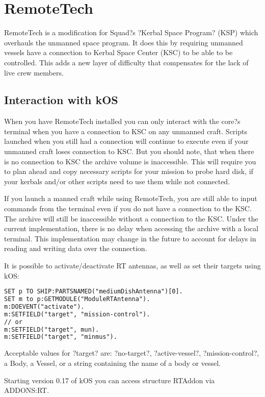 	\section{RemoteTech}%
	RemoteTech is a modification for Squad?s ?Kerbal Space Program? (KSP) which overhauls the unmanned space program. It does this by requiring unmanned vessels have a connection to Kerbal Space Center (KSC) to be able to be controlled. This adds a new layer of difficulty that compensates for the lack of live crew members.
	\subsection{Interaction with kOS}
When you have RemoteTech installed you can only interact with the core?s terminal when you have a connection to KSC on any unmanned craft. Scripts launched when you still had a connection will continue to execute even if your unmanned craft loses connection to KSC. But you should note, that when there is no connection to KSC the archive volume is inaccessible. This will require you to plan ahead and copy necessary scripts for your mission to probe hard disk, if your kerbals and/or other scripts need to use them while not connected.

If you launch a manned craft while using RemoteTech, you are still able to input commands from the terminal even if you do not have a connection to the KSC. The archive will still be inaccessible without a connection to the KSC. Under the current implementation, there is no delay when accessing the archive with a local terminal. This implementation may change in the future to account for delays in reading and writing data over the connection.

It is possible to activate/deactivate RT antennas, as well as set their targets using kOS:

\begin{lstlisting}[frame=single,language=XML]
SET p TO SHIP:PARTSNAMED("mediumDishAntenna")[0].
SET m to p:GETMODULE("ModuleRTAntenna").
m:DOEVENT("activate").
m:SETFIELD("target", "mission-control").
// or
m:SETFIELD("target", mun).
m:SETFIELD("target", "minmus").
\end{lstlisting}

Acceptable values for ?target? are: ?no-target?, ?active-vessel?, ?mission-control?, a Body, a Vessel, or a string containing the name of a body or vessel.

Starting version 0.17 of kOS you can access structure RTAddon via ADDONS:RT.

